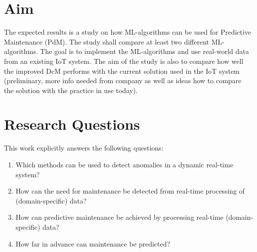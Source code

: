 \section{Aim}
\label{sec:aim}
The expected results is a study on how ML-algorithms can be used for Predictive Maintenance (PdM).
The study shall compare at least two different ML-algorithms.
The goal is to implement the ML-algorithms and use real-world data from an existing IoT system.
The aim of the study is also to compare how well the improved DcM performs with the current solution used in the IoT system (preliminary, more info needed from company as well as ideas how to compare the solution with the practice in use today).


\section{Research Questions}
\label{sec:research-questions}
This work explicitly answers the following questions:
\begin{enumerate}
  \item Which methods can be used to detect anomalies in a dynamic real-time system?
  \item How can the need for maintenance be detected from real-time processing of (domain-specific) data?
  \item How can predictive maintenance be achieved by processing real-time (domain-specific) data?
  \item How far in advance can maintenance be predicted?
\end{enumerate}

